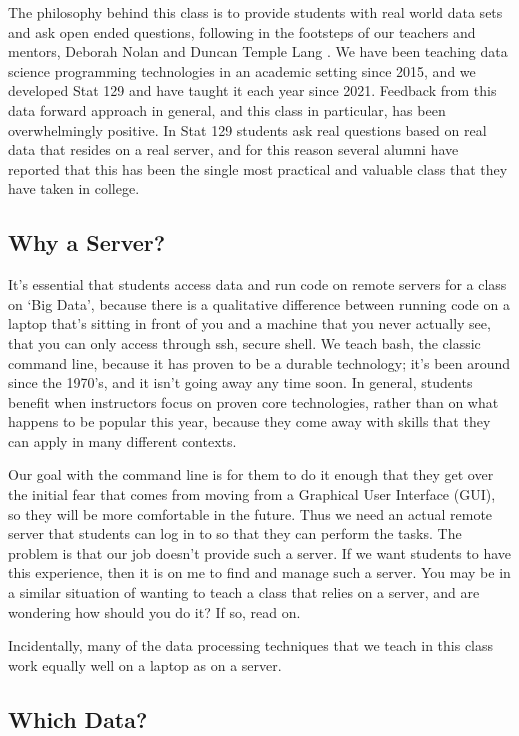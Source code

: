 \documentclass[12pt]{article}
\begin{document}
The philosophy behind this class is to provide students with real world data sets and ask open ended questions, following in the footsteps of our teachers and mentors, Deborah Nolan and Duncan Temple Lang \cite{nolan2010computing}.
We have been teaching data science programming technologies in an academic setting since 2015, and we developed Stat 129 and have taught it each year since 2021.
Feedback from this data forward approach in general, and this class in particular, has been overwhelmingly positive.
In Stat 129 students ask real questions based on real data that resides on a real server, and for this reason several alumni have reported that this has been the single most practical and valuable class that they have taken in college.


\subsection{Why a Server?}

It's essential that students access data and run code on remote servers for a class on `Big Data', because there is a qualitative difference between running code on a laptop that's sitting in front of you and a machine that you never actually see, that you can only access through ssh, secure shell.
We teach bash, the classic command line, because it has proven to be a durable technology; it's been around since the 1970's, and it isn't going away any time soon.
In general, students benefit when instructors focus on proven core technologies, rather than on what happens to be popular this year, because they come away with skills that they can apply in many different contexts.

Our goal with the command line is for them to do it enough that they get over the initial fear that comes from moving from a Graphical User Interface (GUI), so they will be more comfortable in the future.
Thus we need an actual remote server that students can log in to so that they can perform the tasks.
The problem is that our job doesn't provide such a server.
If we want students to have this experience, then it is on me to find and manage such a server.
You may be in a similar situation of wanting to teach a class that relies on a server, and are wondering how should you do it?
If so, read on.

Incidentally, many of the data processing techniques that we teach in this class work equally well on a laptop as on a server.

\subsection{Which Data?}
\end{document}

